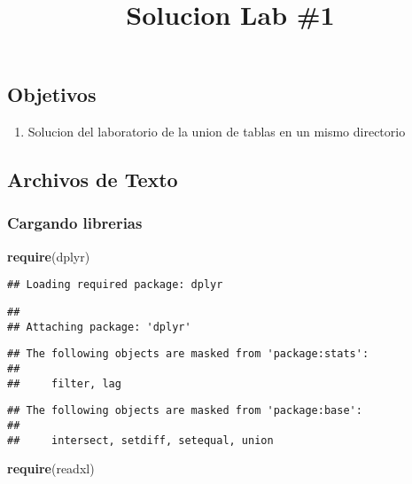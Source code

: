 \documentclass[]{article}
\title{Solucion Lab \#1}
\author{}
\date{}
\newenvironment{Shaded}{\begin{snugshade}}{\end{snugshade}}
\newcommand{\KeywordTok}[1]{\textcolor[rgb]{0.13,0.29,0.53}{\textbf{#1}}}
\newcommand{\NormalTok}[1]{#1}
\providecommand{\tightlist}{%
  \setlength{\itemsep}{0pt}\setlength{\parskip}{0pt}}
\begin{document}
\maketitle

\subsection{Objetivos}\label{objetivos}

\begin{enumerate}
\def\labelenumi{\arabic{enumi}.}
\tightlist
\item
  Solucion del laboratorio de la union de tablas en un mismo directorio
\end{enumerate}

\subsection{Archivos de Texto}\label{archivos-de-texto}

\subsubsection{Cargando librerias}\label{cargando-librerias}

\begin{Shaded}
\begin{Highlighting}[]
\KeywordTok{require}\NormalTok{(dplyr)}
\end{Highlighting}
\end{Shaded}

\begin{verbatim}
## Loading required package: dplyr
\end{verbatim}

\begin{verbatim}
## 
## Attaching package: 'dplyr'
\end{verbatim}

\begin{verbatim}
## The following objects are masked from 'package:stats':
## 
##     filter, lag
\end{verbatim}

\begin{verbatim}
## The following objects are masked from 'package:base':
## 
##     intersect, setdiff, setequal, union
\end{verbatim}

\begin{Shaded}
\begin{Highlighting}[]
\KeywordTok{require}\NormalTok{(readxl)}
\end{Highlighting}
\end{Shaded}
\end{document}
